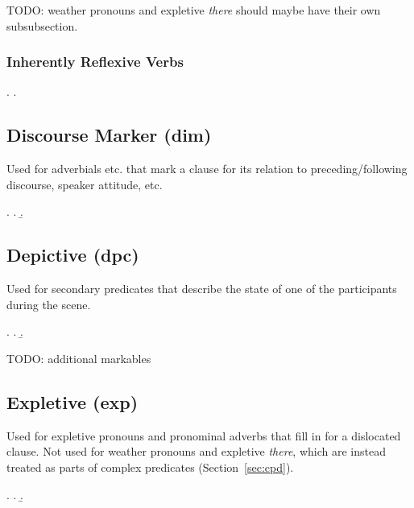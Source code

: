 \documentclass[a4paper]{article}
\begin{document}
TODO: weather pronouns and expletive \emph{there} should maybe have their own
subsubsection.

\subsubsection{Inherently Reflexive Verbs}

\ex.
\a. 


\clearpage
\subsection{Discourse Marker (\textsf{dim})}
\label{sec:dim}

Used for adverbials etc. that mark a clause for its relation to preceding/following discourse, speaker attitude, etc.

\ex.
\a. 
\b. 

\clearpage
\subsection{Depictive (\textsf{dpc})}
\label{sec:dpc}

Used for secondary predicates that describe the state of one of the participants during the scene.

\ex.
\a. 
\b. 

TODO: additional markables

\clearpage
\subsection{Expletive (\textsf{exp})}
\label{sec:exp}

Used for expletive pronouns and pronominal adverbs that fill in for a
dislocated clause. Not used for weather pronouns and expletive \emph{there},
which are instead treated as parts of complex predicates
(Section~\ref{sec:cpd}).

\ex.
\a. 
\b. 
\end{document}
